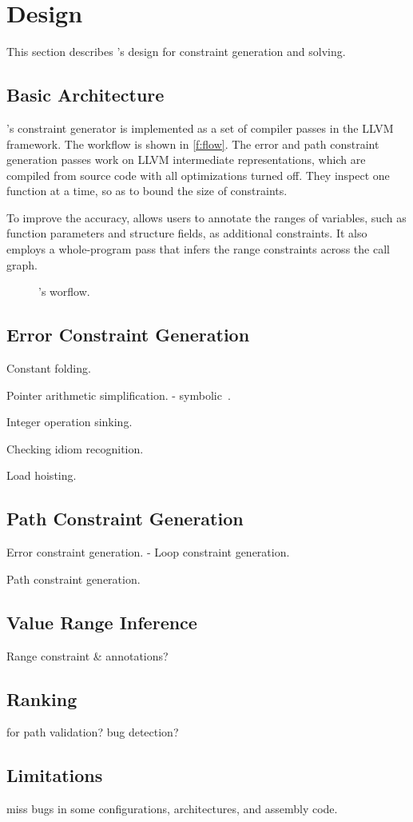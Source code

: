 \section{Design}
\label{s:gen}

This section describes \sys's design for constraint generation and
solving.

\subsection{Basic Architecture}

\sys's constraint generator is implemented as a set of compiler
passes in the LLVM~\cite{lattner:llvm} framework.  The workflow is
shown in \autoref{f:flow}.  The error and path constraint generation
passes work on LLVM intermediate representations, which are compiled
from source code with all optimizations turned off.  They inspect
one function at a time, so as to bound the size of constraints.

To improve the accuracy, \sys allows users to annotate the ranges
of variables, such as function parameters and structure fields, as
additional constraints. It also employs a whole-program pass that
infers the range constraints across the call graph.

\begin{figure}
\centering
\resizebox{0.9\linewidth}{!}{

}
\caption{\sys's worflow.}
\label{f:flow}
\end{figure}

\subsection{Error Constraint Generation}


Constant folding.

Pointer arithmetic simplification.
- symbolic~\cite{engelen:symbolic}.

Integer operation sinking.

Checking idiom recognition.

Load hoisting.

\subsection{Path Constraint Generation}

Error constraint generation.
- Loop constraint generation.

Path constraint generation.

\subsection{Value Range Inference}

Range constraint \& annotations?

\subsection{Ranking}

for path validation? bug detection?

\subsection{Limitations}

miss bugs in some configurations, architectures,
and assembly code.
